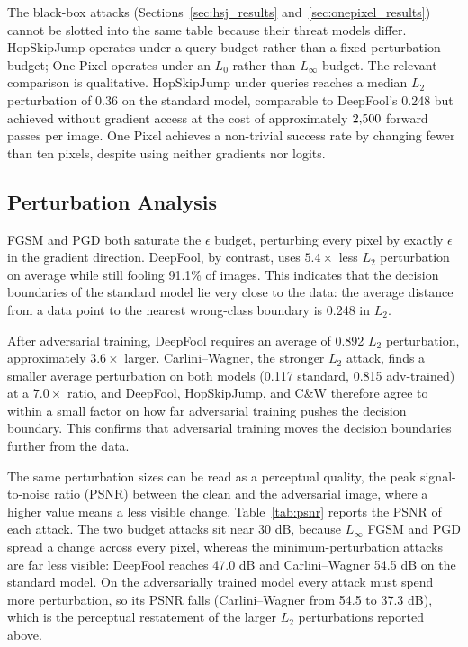 The black-box attacks (Sections~\ref{sec:hsj_results} and~\ref{sec:onepixel_results}) cannot be slotted into the same table because their threat models differ. HopSkipJump operates under a query budget rather than a fixed perturbation budget; One Pixel operates under an $L_0$ rather than $L_\infty$ budget. The relevant comparison is qualitative. HopSkipJump under \HSJQ{} queries reaches a median $L_2$ perturbation of 0.36 on the standard model, comparable to DeepFool's 0.248 but achieved without gradient access at the cost of approximately $2{,}500{}$ forward passes per image. One Pixel achieves a non-trivial success rate by changing fewer than ten pixels, despite using neither gradients nor logits.

\subsection{Perturbation Analysis}

FGSM and PGD both saturate the $\epsilon$ budget, perturbing every pixel by exactly $\epsilon$ in the gradient direction. DeepFool, by contrast, uses $5.4\times$ less $L_2$ perturbation on average while still fooling 91.1\% of images. This indicates that the decision boundaries of the standard model lie very close to the data: the average distance from a data point to the nearest wrong-class boundary is 0.248 in $L_2$.

After adversarial training, DeepFool requires an average of 0.892 $L_2$ perturbation, approximately $3.6\times$ larger. Carlini--Wagner, the stronger $L_2$ attack, finds a smaller average perturbation on both models (0.117 standard, 0.815 adv-trained) at a $7.0\times$ ratio, and DeepFool, HopSkipJump, and C\&W therefore agree to within a small factor on how far adversarial training pushes the decision boundary. This confirms that adversarial training moves the decision boundaries further from the data.

The same perturbation sizes can be read as a perceptual quality, the peak signal-to-noise ratio (PSNR) between the clean and the adversarial image, where a higher value means a less visible change. Table~\ref{tab:psnr} reports the PSNR of each attack. The two budget attacks sit near 30 dB, because $L_\infty$ FGSM and PGD spread a change across every pixel, whereas the minimum-perturbation attacks are far less visible: DeepFool reaches 47.0 dB and Carlini--Wagner 54.5 dB on the standard model. On the adversarially trained model every attack must spend more perturbation, so its PSNR falls (Carlini--Wagner from 54.5 to 37.3 dB), which is the perceptual restatement of the larger $L_2$ perturbations reported above.


